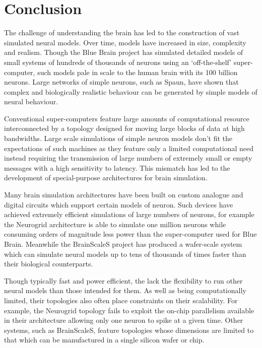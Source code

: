 \chapter{Conclusion}
	
	The challenge of understanding the brain has led to the construction of vast
	simulated neural models. Over time, models have increased in size, complexity
	and realism. Though the Blue Brain project has simulated detailed models of
	small systems of hundreds of thousands of neurons using an `off-the-shelf'
	super-computer, such models pale in scale to the human brain with its 100
	billion neurons.  Large networks of simple neurons, such as Spaun, have shown
	that complex and biologically realistic behaviour can be generated by simple
	models of neural behaviour.
	
	Conventional super-computers feature large amounts of computational resource
	interconnected by a topology designed for moving large blocks of data at high
	bandwidths.  Large scale simulations of simple neuron models don't fit the
	expectations of such machines as they feature only a limited computational
	need instead requiring the transmission of large numbers of extremely small or
	empty messages with a high sensitivity to latency. This mismatch has led to
	the development of special-purpose architectures for brain simulation.
	
	Many brain simulation architectures have been built on custom analogue and
	digital circuits which support certain models of neuron. Such devices have
	achieved extremely efficient simulations of large numbers of neurons, for
	example the Neurogrid architecture is able to simulate one million neurons
	while consuming orders of magnitude less power than the super-computer used
	for Blue Brain. Meanwhile the BrainScaleS project has produced a wafer-scale
	system which can simulate neural models up to tens of thousands of times
	faster than their biological counterparts.
	
	Though typically fast and power efficient, the lack the flexibility to run
	other neural models than those intended for them. As well as being
	computationally limited, their topologies also often place constraints on
	their scalability. For example, the Neurogrid topology fails to exploit the
	on-chip parallelism available in their architecture allowing only one neuron
	to spike at a given time. Other systems, such as BrainScaleS, feature
	topologies whose dimensions are limited to that which can be manufactured in a
	single silicon wafer or chip.
	
